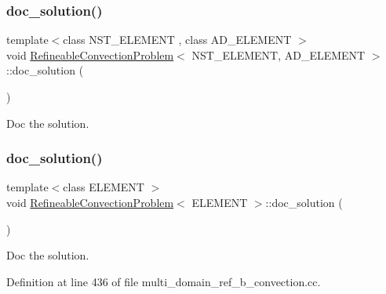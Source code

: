 \mbox{\label{classRefineableConvectionProblem_a8f6c4ead999c108394b6c6eb121daa51}} 
\subsubsection{\texorpdfstring{doc\+\_\+solution()}{doc\_solution()}\hspace{0.1cm}{\footnotesize\ttfamily [1/2]}}
{\footnotesize\ttfamily template$<$class N\+S\+T\+\_\+\+E\+L\+E\+M\+E\+NT , class A\+D\+\_\+\+E\+L\+E\+M\+E\+NT $>$ \\
void \hyperlink{classRefineableConvectionProblem}{Refineable\+Convection\+Problem}$<$ N\+S\+T\+\_\+\+E\+L\+E\+M\+E\+NT, A\+D\+\_\+\+E\+L\+E\+M\+E\+NT $>$\+::doc\+\_\+solution (\begin{DoxyParamCaption}{ }\end{DoxyParamCaption})}



Doc the solution. 

\mbox{\label{classRefineableConvectionProblem_a47efcb3467931e13e12687303135e38b}} 
\subsubsection{\texorpdfstring{doc\+\_\+solution()}{doc\_solution()}\hspace{0.1cm}{\footnotesize\ttfamily [2/2]}}
{\footnotesize\ttfamily template$<$class E\+L\+E\+M\+E\+NT $>$ \\
void \hyperlink{classRefineableConvectionProblem}{Refineable\+Convection\+Problem}$<$ E\+L\+E\+M\+E\+NT $>$\+::doc\+\_\+solution (\begin{DoxyParamCaption}{ }\end{DoxyParamCaption})}



Doc the solution. 



Definition at line 436 of file multi\+\_\+domain\+\_\+ref\+\_\+b\+\_\+convection.\+cc.



